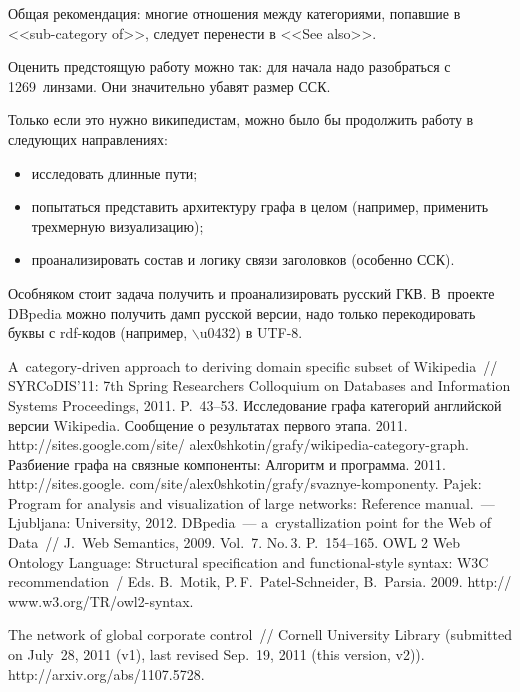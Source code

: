 \begin{multicols}{2}
   Общая рекомендация: многие отношения между категориями, попавшие в 
   <<sub-category of>>, следует перенести в <<See also>>.
   
   Оценить предстоящую работу можно так: для начала надо разобраться с 1269~линзами. 
Они значительно убавят размер ССК.
   
   Только если это нужно википедистам, можно было бы продолжить работу в следующих 
на\-прав\-ле\-ни\-ях:
   \begin{itemize}
   \item исследовать длинные пути;
   \item попытаться представить архитектуру графа в целом (например, применить 
   трехмерную визуализацию);
   \item проанализировать состав и логику связи заголовков (особенно ССК).
   \end{itemize}
   
   Особняком стоит задача получить и проанализировать русский ГКВ. В~проекте DBpedia 
можно получить дамп русской версии, надо только перекодировать буквы с rdf-кодов 
(например, $\backslash$u0432) в UTF-8.
   
{\small\frenchspacing
{%
\begin{thebibliography}{9}

 A~category-driven approach to 
deriving domain specific subset of Wikipedia~// SYRCoDIS'11: 7th Spring Researchers 
Colloquium on Databases and Information Systems Proceedings, 2011. P.~43--53.
 Исследование графа категорий английской версии Wikipedia. 
Сообщение о результатах первого этапа. 2011. {\sf http://sites.google.com/site/ alex0shkotin/grafy/wikipedia-category-graph}.
 Разбиение графа на связные компоненты: Алгоритм и программа. 2011. 
{\sf http://sites.google. com/site/alex0shkotin/grafy/svaznye-komponenty}.
 Pajek: Program for analysis and visualization of large networks: 
Reference manual.~--- Ljubljana: University,  2012.
DBpedia~--- a~crystallization point for the Web of Data~// J.~Web Semantics, 2009. Vol.~7. 
No.\,3. P.~154--165.
OWL 2 Web Ontology Language: Structural specification and functional-style 
syntax: W3C recommendation~/ Eds. B.~Motik, P.\,F.~Patel-Schneider, 
B.~Parsia. 2009. {\sf http:// www.w3.org/TR/owl2-syntax}. 

\label{end\stat}

 The network of global corporate control~// 
Cornell University Library (submitted on July~28, 2011 (v1), last revised  Sep.~19, 2011 (this 
version, v2)). {\sf http://arxiv.org/abs/1107.5728}.
\end{thebibliography}
} }

\end{multicols}